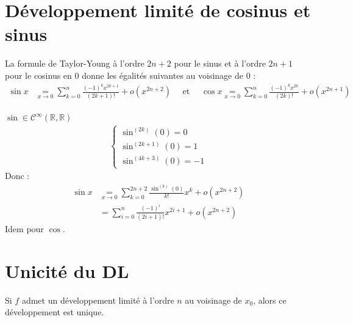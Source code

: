 \documentclass[../main.tex]{subfiles}
\begin{document}
\section{Développement limité de cosinus et sinus}
\begin{tcolorbox}[title=Propostion 25.30, title filled=false, colframe=lightblue, colback=lightblue!10!white]
    La formule de Taylor-Young à l'ordre $2n + 2$ pour le sinus et à l'ordre $2n + 1$ pour le cosinus en $0$ donne les égalités suivantes au voisinage de $0$ : 
    \begin{align*}
        \sin x &\underset{x\to 0}{=} \sum_{k=0}^{n} \frac{(-1)^k x^{2k+1}}{(2k+1)!} + o(x^{2n+2}) \quad \text{ et } \quad \cos x \underset{x\to 0}{=} \sum_{k=0}^{n} \frac{(-1)^k x^{2k}}{(2k)!} + o(x^{2n+1}) \\
    \end{align*}
\end{tcolorbox}

\noindent $\sin \in \mathcal{C}^{\infty}(\mathbb{R}, \mathbb{R})$
\begin{align*}
    \begin{cases}
        \sin^{(2k)}(0) = 0 \\
        \sin^{(2k+1)}(0) = 1 \\
        \sin^{(4k+3)}(0) = -1
    \end{cases}
\end{align*}
Donc : 
\begin{align*}
    \sin x &\underset{x\to 0}{=} \sum_{k=0}^{2n+2} \frac{\sin^{(k)}(0)}{k!}x^k + o(x^{2n+2}) \\
    &= \sum_{i=0}^{n} \frac{(-1)^i}{(2i+1)!}x^{2i+1} + o(x^{2n+2})
\end{align*}
Idem pour $\cos$.

\section{Unicité du DL}
\begin{tcolorbox}[title=Théorème 25.40, title filled=false, colframe=orange, colback=orange!10!white]
    Si $f$ admet un développement limité à l'ordre $n$ au voisinage de $x_0$, alors ce développement est unique. 
\end{tcolorbox}
\end{document}
